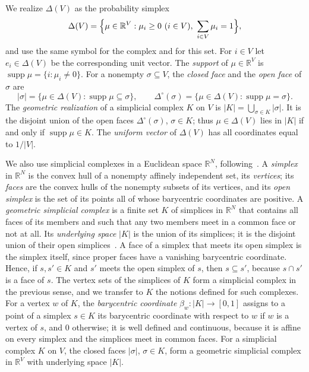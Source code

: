 \documentclass[11pt]{article}
\theoremstyle{definition}
\numberwithin{equation}{section}
\newcommand{\R}{\mathbb R}
\DeclareMathOperator{\supp}{supp}
\begin{document}
We realize $\Delta(V)$ as the probability simplex
\begin{equation*}
 \Delta(V)=\Bigl\{\mu\in\R^V:\mu_i\ge0\ (i\in V),\ \sum_{i\in V}\mu_i=1\Bigr\},
\end{equation*}
and use the same symbol for the complex and for this set. For $i\in V$ let $e_i\in\Delta(V)$ be the corresponding unit vector. The \emph{support} of $\mu\in\R^V$ is $\supp\mu=\{i:\mu_i\ne0\}$. For a nonempty $\sigma\subseteq V$, the \emph{closed face} and the \emph{open face} of $\sigma$ are
\begin{equation*}
 |\sigma|=\{\mu\in\Delta(V):\supp\mu\subseteq\sigma\},\qquad
 \Delta^\circ(\sigma)=\{\mu\in\Delta(V):\supp\mu=\sigma\}.
\end{equation*}
The \emph{geometric realization} of a simplicial complex $K$ on $V$ is $|K|=\bigcup_{\sigma\in K}|\sigma|$. It is the disjoint union of the open faces $\Delta^\circ(\sigma)$, $\sigma\in K$; thus $\mu\in\Delta(V)$ lies in $|K|$ if and only if $\supp\mu\in K$. The \emph{uniform vector} of $\Delta(V)$ has all coordinates equal to $1/|V|$.

We also use simplicial complexes in a Euclidean space $\R^N$, following~\cite[\S3.2.1, pp.~49--51]{Coste}. A \emph{simplex} in $\R^N$ is the convex hull of a nonempty affinely independent set, its \emph{vertices}; its \emph{faces} are the convex hulls of the nonempty subsets of its vertices, and its \emph{open simplex} is the set of its points all of whose barycentric coordinates are positive. A \emph{geometric simplicial complex} is a finite set $K$ of simplices in $\R^N$ that contains all faces of its members and such that any two members meet in a common face or not at all. Its \emph{underlying space} $|K|$ is the union of its simplices; it is the disjoint union of their open simplices~\cite[p.~51]{Coste}. A face of a simplex that meets its open simplex is the simplex itself, since proper faces have a vanishing barycentric coordinate. Hence, if $s,s'\in K$ and $s'$ meets the open simplex of $s$, then $s\subseteq s'$, because $s\cap s'$ is a face of $s$. The vertex sets of the simplices of $K$ form a simplicial complex in the previous sense, and we transfer to $K$ the notions defined for such complexes. For a vertex $w$ of $K$, the \emph{barycentric coordinate} $\beta_w:|K|\to[0,1]$ assigns to a point of a simplex $s\in K$ its barycentric coordinate with respect to $w$ if $w$ is a vertex of $s$, and $0$ otherwise; it is well defined and continuous, because it is affine on every simplex and the simplices meet in common faces. For a simplicial complex $K$ on $V$, the closed faces $|\sigma|$, $\sigma\in K$, form a geometric simplicial complex in $\R^V$ with underlying space $|K|$.
\end{document}
